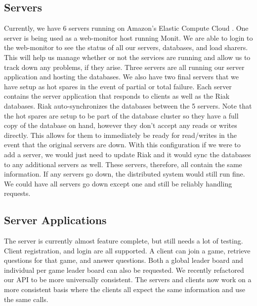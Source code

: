 \documentclass{dependencies/acm_proc_article-sp}
\begin{document}
\subsection {Servers}
Currently, we have 6 servers running on Amazon's Elastic Compute Cloud \cite{aec}. One server is being used as a web-monitor
host running Monit\cite{monit}. We are able to login to the web-monitor to see the status of all our
servers, databases, and load sharers. This will help us manage whether or not the services
are running and allow us to track down any problems, if they arise. Three
servers are all running our server application and hosting the databases.
We also have two final servers that we have setup as hot spares in the event
of partial or total failure.
Each server contains the server application that responds to clients as well as
the Riak \cite{riak} databases. Riak auto-synchronizes the databases between the 5 servers.
Note that the hot spares are setup to be part of the database cluster so they
have a full copy of the database on hand, however they don't accept any reads
or writes directly. This allows for them to immediately be ready for read/writes in the event that the original servers are down.
With this configuration if we were to add a server, we would just need to update 
Riak and it would sync the databases to any additional servers as well. These servers,
therefore, all contain the same information. If any servers go down, the distributed
system would still run fine. We could have all servers go down except one and still
be reliably handling requests.

\subsection{Server Applications}
The server is currently almost feature complete, but still needs a lot of
testing. Client registration, and login are all supported. A client can
join a game, retrieve questions for that game, and answer questions. Both a
global leader board and individual per game leader board can also be requested.
We recently refactored our API to be more universally consistent.
The servers and clients now work on a more consistent basis where the clients all expect the same information and use the same calls.
\end{document}
